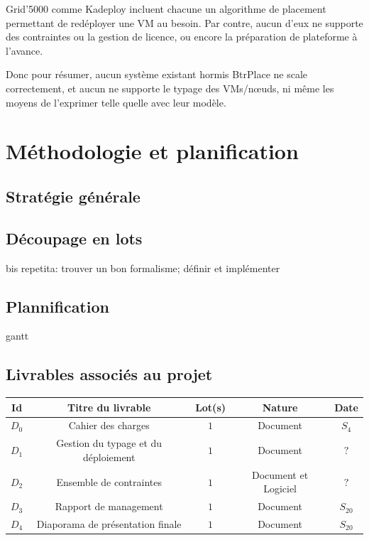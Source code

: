 \documentclass[a4paper]{article}
\begin{document}
Grid'5000 comme Kadeploy incluent chacune un algorithme de placement
permettant de redéployer une VM au besoin. Par contre, aucun d'eux
ne supporte des contraintes ou la gestion de licence, ou encore la
préparation de plateforme à l'avance.

Donc pour résumer, aucun système existant hormis BtrPlace ne scale
correctement, et aucun ne supporte le typage des VMs/nœuds, ni même
les moyens de l'exprimer telle quelle avec leur modèle.

\section{Méthodologie et planification}
\subsection{Stratégie générale}
\subsection{Découpage en lots}
bis repetita: trouver un bon formalisme; définir et implémenter
\subsection{Plannification}
gantt
\subsection{Livrables associés au projet}
\begin{table}
\centering
\begin{tabular}{c|c|c|c|c}
	Id & Titre du livrable & Lot(s) & Nature & Date \\
	\hline
	\hline
	$D_0$ & Cahier des charges & $1$ & Document & $S_4$ \\
	\hline
	$D_1$ & Gestion du typage et du déploiement & $1$ & Document & $?$ \\
	\hline
	$D_2$ & Ensemble de contraintes & $1$ & Document et Logiciel & $?$ \\
	\hline
	$D_3$ & Rapport de management & $1$ & Document & $S_{20}$ \\
	\hline
	$D_4$ & Diaporama de présentation finale & $1$ & Document & $S_{20}$ \\
\end{tabular}
\end{table}
\end{document}
